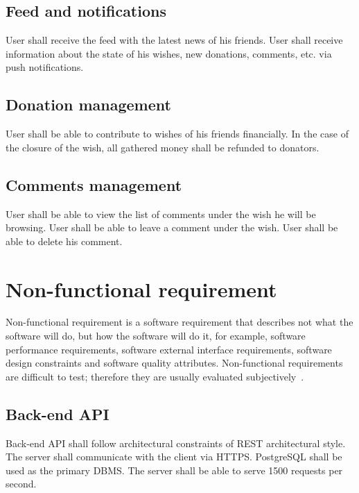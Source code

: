 \subsection*{Feed and notifications}
\begin{itemize}
User shall receive the feed with the latest news of his friends.
User shall receive information about the state of his wishes, new donations, comments, etc. via push notifications.
\end{itemize}

\subsection*{Donation management}
\begin{itemize}
User shall be able to contribute to wishes of his friends financially.
In the case of the closure of the wish, all gathered money shall be refunded to donators.
\end{itemize}

\subsection*{Comments management}
\begin{itemize}
User shall be able to view the list of comments under the wish he will be browsing.
User shall be able to leave a comment under the wish.
User shall be able to delete his comment.
\end{itemize}

\section{Non-functional requirement}
Non-functional requirement is a software requirement that describes not what the software will do, but how the software
will do it, for example, software performance requirements, software external interface requirements, software design
constraints and software quality attributes. Non-functional requirements are difficult to test; therefore they are
usually evaluated subjectively~\cite{nonfuncreq}.

\subsection*{Back-end \ac{API}}
\begin{itemize}
Back-end API shall follow architectural constraints of \acs{REST} architectural style.
The server shall communicate with the client via \ac{HTTPS}.
PostgreSQL shall be used as the primary \ac{DBMS}.
The server shall be able to serve 1500 requests per second.
\end{itemize}

